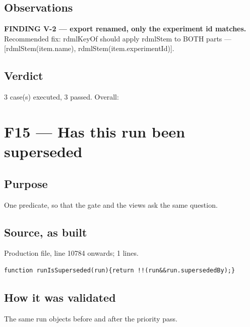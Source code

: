 \subsection*{Observations}
\textbf{FINDING \allowbreak{}V-\allowbreak{}2 \allowbreak{}— \allowbreak{}export \allowbreak{}renamed,\allowbreak{} \allowbreak{}only \allowbreak{}the \allowbreak{}experiment \allowbreak{}id \allowbreak{}matches.} Recommended \allowbreak{}fix:\allowbreak{} \allowbreak{}rdml\allowbreak{}Key\allowbreak{}Of \allowbreak{}should \allowbreak{}apply \allowbreak{}rdml\allowbreak{}Stem \allowbreak{}to \allowbreak{}BOTH \allowbreak{}parts \allowbreak{}— \allowbreak{}[\allowbreak{}rdml\allowbreak{}Stem(\allowbreak{}item.\allowbreak{}name)\allowbreak{},\allowbreak{} \allowbreak{}rdml\allowbreak{}Stem(\allowbreak{}item.\allowbreak{}experiment\allowbreak{}Id)\allowbreak{}]\allowbreak{}.\allowbreak{}
\subsection*{Verdict}
3 case(s) executed, 3 passed. Overall: \PASS
\clearpage
\section{F15\quad{} --- Has this run been superseded}
\label{sec:runIsSuperseded}
\subsection*{Purpose}
One predicate, so that the gate and the views ask the same question.
\subsection*{Source, as built}
Production file, line 10784 onwards; 1 lines.
\begin{lstlisting}[style=js]
function runIsSuperseded(run){return !!(run&&run.supersededBy);}
\end{lstlisting}

\subsection*{How it was validated}
The same run objects before and after the priority pass.
